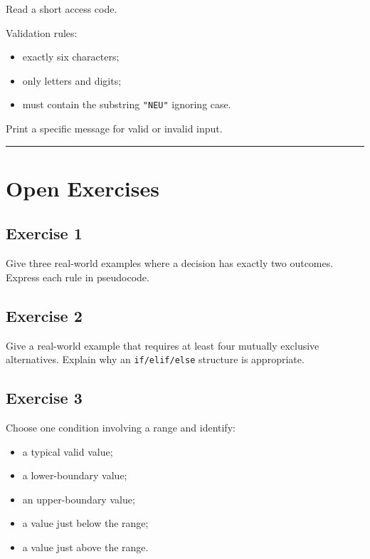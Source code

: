 \documentclass[
  11pt,
  a4paper,
]{article}
\providecommand{\tightlist}{%
  \setlength{\itemsep}{0pt}\setlength{\parskip}{0pt}}
\begin{document}
Read a short access code.

Validation rules:

\begin{itemize}
\tightlist
\item
  exactly six characters;
\item
  only letters and digits;
\item
  must contain the substring \texttt{"NEU"} ignoring case.
\end{itemize}

Print a specific message for valid or invalid input.

\begin{center}\rule{0.5\linewidth}{0.5pt}\end{center}

\section{Open Exercises}\label{open-exercises}

\subsection{Exercise 1}\label{exercise-1}

Give three real-world examples where a decision has exactly two
outcomes. Express each rule in pseudocode.

\subsection{Exercise 2}\label{exercise-2}

Give a real-world example that requires at least four mutually exclusive
alternatives. Explain why an \texttt{if/elif/else} structure is
appropriate.

\subsection{Exercise 3}\label{exercise-3}

Choose one condition involving a range and identify:

\begin{itemize}
\tightlist
\item
  a typical valid value;
\item
  a lower-boundary value;
\item
  an upper-boundary value;
\item
  a value just below the range;
\item
  a value just above the range.
\end{itemize}
\end{document}
